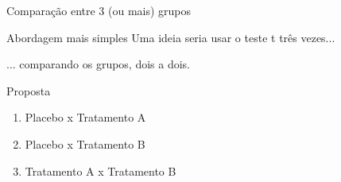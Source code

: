 \documentclass{beamer}
\begin{document}
\begin{frame}{\small Comparação entre 3 (ou mais) grupos}
  \begin{block}{Abordagem mais simples}
    \small
    Uma ideia seria usar o teste t três vezes...

    \bigskip
    ... comparando os grupos, dois a dois.
  \end{block}
  \vfill
  \begin{block}{Proposta}
    \begin{enumerate}
      \footnotesize
    \item Placebo x Tratamento A
    \item Placebo x Tratamento B
    \item Tratamento A x Tratamento B
    \end{enumerate}
  \end{block}
\end{frame}
\end{document}
